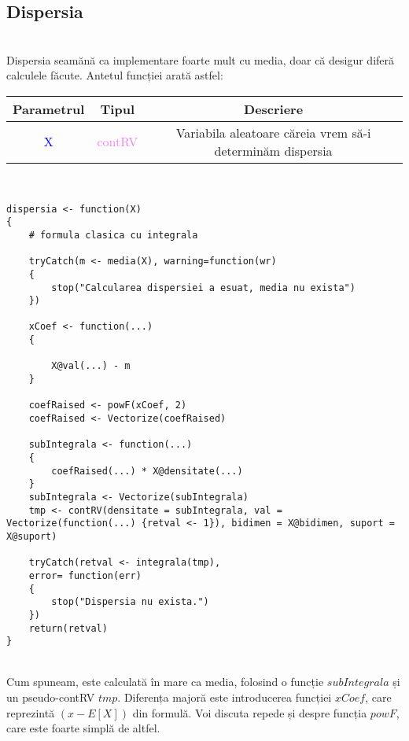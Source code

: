 \documentclass[12pt]{article}
\begin{document}
\subsection{Dispersia} \hfill \\
\indent Dispersia seamănă ca implementare foarte mult cu media, doar că desigur diferă calculele făcute. Antetul funcției arată astfel:
\begin{center}
	\begin{tabular}{|| c | c | c ||}
		\hline
		Parametrul & Tipul & Descriere \\
		\hline
		\textcolor{blue}{X} & \textcolor{violet}{contRV} & Variabila aleatoare căreia vrem să-i determinăm dispersia\\
		\hline
	\end{tabular}
\end{center}\hfill \\
\begin{lstlisting}
dispersia <- function(X)
{
	# formula clasica cu integrala
	
	tryCatch(m <- media(X), warning=function(wr)
	{
		stop("Calcularea dispersiei a esuat, media nu exista")
	})
	
	xCoef <- function(...)
	{
		
		X@val(...) - m
	}
	
	coefRaised <- powF(xCoef, 2)
	coefRaised <- Vectorize(coefRaised)
	
	subIntegrala <- function(...)
	{
		coefRaised(...) * X@densitate(...)
	}
	subIntegrala <- Vectorize(subIntegrala)
	tmp <- contRV(densitate = subIntegrala, val = Vectorize(function(...) {retval <- 1}), bidimen = X@bidimen, suport = X@suport)
	
	tryCatch(retval <- integrala(tmp),
	error= function(err)
	{
		stop("Dispersia nu exista.")
	})
	return(retval)
}
\end{lstlisting}\hfill \\
\indent Cum spuneam, este calculată în mare ca media, folosind o funcție $subIntegrala$ și un pseudo-contRV $tmp$. Diferența majoră este introducerea funcției $xCoef$, care reprezintă $(x - E[X])$ din formulă. Voi discuta repede și despre funcția $powF$, care este foarte simplă de altfel. \\
\end{document}

